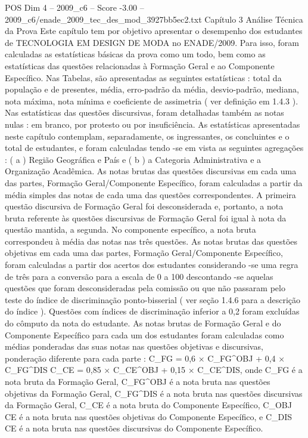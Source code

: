 \begin{textsample}{POS Dim 4 – 2009\_c6 – Score -3.00 – 2009\_c6/enade\_2009\_tec\_des\_mod\_3927bb5ec2.txt}  \label{ex:f4_pos_324}
Capítulo 3 Análise Técnica da Prova Este capítulo tem por objetivo apresentar o desempenho dos estudantes de TECNOLOGIA EM DESIGN DE MODA no ENADE/2009.
Para isso, foram calculadas as estatísticas básicas da prova como um todo, bem como as estatísticas das questões relacionadas à Formação Geral e ao Componente Específico.
Nas Tabelas, são apresentadas as seguintes estatísticas : total da população e de presentes, média, erro-padrão da média, desvio-padrão, mediana, nota máxima, nota mínima e coeficiente de assimetria ( ver definição em 1.4.3 ).
Nas estatísticas das questões discursivas, foram detalhadas também as notas nulas : em branco, por protesto ou por insuficiência.
As estatísticas apresentadas neste capítulo contemplam, separadamente, os ingressantes, os concluintes e o total de estudantes, e foram calculadas tendo -se em vista as seguintes agregações : ( a ) Região Geográfica e País e ( b ) a Categoria Administrativa e a Organização Acadêmica.
As notas brutas das questões discursivas em cada uma das partes, Formação Geral/Componente Específico, foram calculadas a partir da média simples das notas de cada uma das questões correspondentes.
A primeira questão discursiva de Formação Geral foi desconsiderada e, portanto, a nota bruta referente às questões discursivas de Formação Geral foi igual à nota da questão mantida, a segunda.
No componente específico, a nota bruta correspondeu à média das notas nas três questões.
As notas brutas das questões objetivas em cada uma das partes, Formação Geral/Componente Específico, foram calculadas a partir dos acertos dos estudantes considerando -se uma regra de três para a conversão para a escala de 0 a 100 descontando -se aquelas questões que foram desconsideradas pela comissão ou que não passaram pelo teste do índice de discriminação ponto-bisserial ( ver seção 1.4.6 para a descrição do índice ).
Questões com índices de discriminação inferior a 0,2 foram excluídas do cômputo da nota do estudante.
As notas brutas de Formação Geral e do Componente Específico para cada um dos estudantes foram calculadas como médias ponderadas das suas notas nas questões objetivas e discursivas, ponderação diferente para cada parte : C\_FG = 0,6 × C\_FG\textasciicircum{}OBJ + 0,4 × C\_FG\textasciicircum{}DIS C\_CE = 0,85 × C\_CE\textasciicircum{}OBJ + 0,15 × C\_CE\textasciicircum{}DIS, onde C\_FG é a nota bruta da Formação Geral, C\_FG\textasciicircum{}OBJ é a nota bruta nas questões objetivas da Formação Geral, C\_FG\textasciicircum{}DIS é a nota bruta nas questões discursivas da Formação Geral, C\_CE é a nota bruta do Componente Específico, C\_OBJ CE é a nota bruta nas questões objetivas do Componente Específico, e C\_DIS CE é a nota bruta nas questões discursivas do Componente Específico.

\end{textsample}
